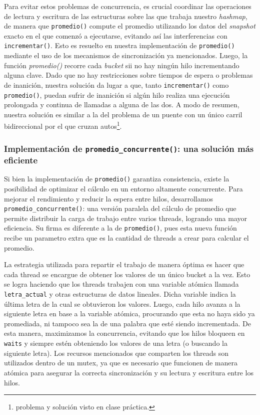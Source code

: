 \documentclass[a4paper]{article}
\begin{document}
    Para evitar estos problemas de concurrencia, es crucial coordinar las operaciones de lectura y escritura de las estructuras sobre las que trabaja nuestro \textit{hashmap}, de manera que \texttt{promedio()} compute el promedio utilizando los datos del \textit{snapshot} exacto en el que comenzó a ejecutarse, evitando así las interferencias con \texttt{incrementar()}. Esto es resuelto en nuestra implementación de \texttt{promedio()} mediante el uso de los mecanismos de sincronización ya mencionados. Luego, la función \textit{promedio()} recorre cada \textit{bucket} sii no hay ningún hilo incrementando alguna clave. Dado que no hay restricciones sobre tiempos de espera o problemas de inanición, nuestra solución da lugar a que, tanto \texttt{incrementar()} como \texttt{promedio()}, puedan sufrir de inanición si algún hilo realiza una ejecución prolongada y continua de llamadas a alguna de las dos. A modo de resumen, nuestra solución es similar a la del problema de un puente con un único carril bidireccional por el que cruzan autos\footnote{problema y solución visto en clase práctica.\label{fnlabel}}.

    \subsubsection{Implementación de \texttt{promedio\_concurrente()}: una solución más eficiente}

    Si bien la implementación de \texttt{promedio()} garantiza consistencia, existe la posibilidad de optimizar el cálculo en un entorno altamente concurrente. Para mejorar el rendimiento y reducir la espera entre hilos, desarrollamos \texttt{promedio\_concurrente()}: una versión paralela del cálculo de promedio que permite distribuir la carga de trabajo entre varios threads, logrando una mayor eficiencia. Su firma es diferente a la de \texttt{promedio()}, pues esta nueva función recibe un parametro extra que es la cantidad de threads a crear para calcular el promedio.

    La estrategia utilizada para repartir el trabajo de manera óptima es hacer que cada thread se encargue de obtener los valores de un único bucket a la vez. Esto se logra haciendo que los threads trabajen con una variable atómica llamada \texttt{letra\_actual} y otras estructuras de datos lineales. Dicha variable indica la última letra de la cual se obtuvieron los valores. Luego, cada hilo avanza a la siguiente letra en base a la variable atómica, procurando que esta no haya sido ya promediada, ni tampoco sea la de una palabra que esté siendo incrementada. De esta manera, maximizamos la concurrencia, evitando que los hilos bloqueen en \texttt{waits} y siempre estén obteniendo los valores de una letra (o buscando la siguiente letra). Los recursos mencionados que comparten los threads son utilizados dentro de un mutex, ya que es necesario que funcionen de manera atómica para asegurar la correcta sincronización y su lectura y escritura entre los hilos.
\end{document}
